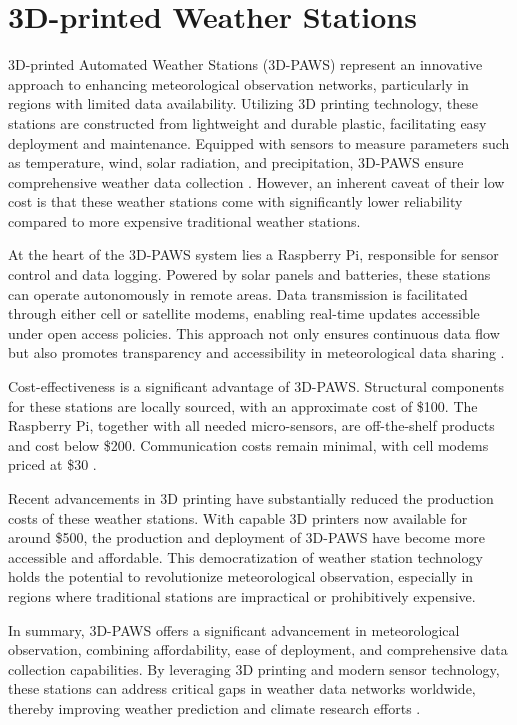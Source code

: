 \section{3D-printed Weather Stations}
\label{sec: 3d_printed_stations}

3D-printed Automated Weather Stations (3D-PAWS) represent an innovative approach to enhancing meteorological observation networks, particularly in regions with limited data availability.
Utilizing 3D printing technology, these stations are constructed from lightweight and durable plastic, facilitating easy deployment and maintenance.
Equipped with sensors to measure parameters such as temperature, wind, solar radiation, and precipitation, 3D-PAWS ensure comprehensive weather data collection \cite{mwangi2017paws}.
However, an inherent caveat of their low cost is that these weather stations come with significantly lower reliability compared to more expensive traditional weather stations.

At the heart of the 3D-PAWS system lies a Raspberry Pi, responsible for sensor control and data logging. Powered by solar panels and batteries, these stations can operate autonomously in remote areas.
Data transmission is facilitated through either cell or satellite modems, enabling real-time updates accessible under open access policies.
This approach not only ensures continuous data flow but also promotes transparency and accessibility in meteorological data sharing \cite{mwangi2017paws}.

Cost-effectiveness is a significant advantage of 3D-PAWS. Structural components for these stations are locally sourced, with an approximate cost of \$100.
The Raspberry Pi, together with all needed micro-sensors, are off-the-shelf products and cost below \$200. Communication costs remain minimal, with cell modems priced at \$30 \cite{mwangi2017paws}.

Recent advancements in 3D printing have substantially reduced the production costs of these weather stations.
With capable 3D printers now available for around \$500, the production and deployment of 3D-PAWS have become more accessible and affordable.
This democratization of weather station technology holds the potential to revolutionize meteorological observation, especially in regions where traditional stations are impractical or prohibitively expensive.

In summary, 3D-PAWS offers a significant advancement in meteorological observation, combining affordability, ease of deployment, and comprehensive data collection capabilities.
By leveraging 3D printing and modern sensor technology, these stations can address critical gaps in weather data networks worldwide, thereby improving weather prediction and climate research efforts \cite{muita2021}.


